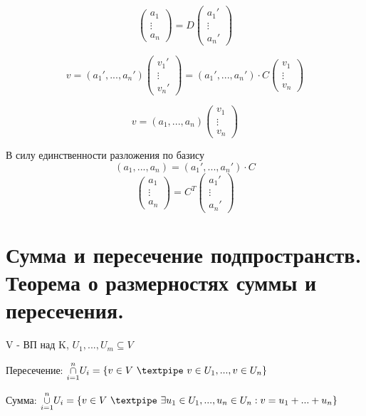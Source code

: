 \documentclass[algebra]{subfiles}
\begin{document}
      \begin{Theorem} 
          \[\begin{pmatrix}
            a_1\\
            \vdots\\
            a_n
          \end{pmatrix} = D
           \begin{pmatrix}
              a_1'\\
            \vdots\\
            a_n'
           \end{pmatrix}\]
      \end{Theorem}

      \begin{Proof}
        \[v = (a_1', ..., a_n') \begin{pmatrix}
          v_1'\\
          \vdots\\
          v_n'
        \end{pmatrix} =
        (a_1', ..., a_n') \cdot C \begin{pmatrix}
          v_1 \\
          \vdots\\
          v_n
        \end{pmatrix} \]

        \[v = (a_1, ..., a_n) \begin{pmatrix}
          v_1\\
          \vdots\\
          v_n
        \end{pmatrix} \]
      \end{Proof}
      В силу единственности разложения по базису
      \[(a_1, ..., a_n) = (a_1', ..., a_n') \cdot C  \]
      \[\begin{pmatrix}
        a_1\\
        \vdots\\
        a_n
      \end{pmatrix} = C^T
      \begin{pmatrix}
        a_1'\\
        \vdots\\
        a_n'
      \end{pmatrix}\]


  \section{Сумма и пересечение подпространств. Теорема о размерностях суммы и пересечения.}
  \begin{definition}
    V - ВП над K, \qq $U_1,...,U_m \subseteq V$

    Пересечение: $\underset{i=1}{\overset{n}{\cap}} U_i = \{ v \in V\ \textpipe\ v \in U_1,...,v \in U_n\}$

    Сумма: $\underset{i=1}{\overset{n}{\cup}} U_i=\{v \in V\ \textpipe\ \exists u_1 \in U_1,...,u_n \in U_n: v=u_1+... + u_n \}$
  \end{definition}
\end{document}
